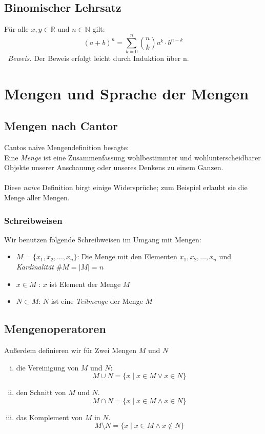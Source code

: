 \documentclass{scrreprt}
\newenvironment{proof}{\emph{\ Beweis.}}{}
\newcommand{\NN}{\mathbb{N}}
\newcommand{\RR}{\mathbb{R}}
\begin{document}
	\section{Binomischer Lehrsatz}
	Für alle $x, y \in \RR$ und $n \in \NN$ gilt:
	\begin{equation*}
		(a+b)^n = \sum\limits_{k=0}^n \binom{n}{k} a^k \cdot b^{n-k}
	\end{equation*}
	\begin{proof}
		Der Beweis erfolgt leicht durch Induktion über n.
	\end{proof}

	\chapter{Mengen und Sprache der Mengen}

	\section{Mengen nach Cantor}
	Cantos naive Mengendefinition besagte:\\
	Eine \emph{Menge} ist eine Zusammenfassung wohlbestimmter und wohlunterscheidbarer Objekte unserer Anschauung oder unseres Denkens zu einem Ganzen.\\ \\
	Diese \emph{naive} Definition birgt einige Widersprüche; zum Beispiel erlaubt sie die Menge aller Mengen.	

	\subsection{Schreibweisen}
	Wir benutzen folgende Schreibweisen im Umgang mit Mengen:
	\begin{itemize}
		\item
			$M = \lbrace x_1, x_2, \dots , x_n\rbrace$: Die Menge mit den Elementen $x_1, x_2, \dots, x_n$ und \emph{Kardinalität} $\# M = |M| = n$
		\item
			$x \in M$ : $x$ ist Element der Menge $M$
		\item
			$N \subset M$: $N$ ist eine \emph{Teilmenge} der Menge $M$
	\end{itemize}

	\section{Mengenoperatoren}
	Außerdem definieren wir für Zwei Mengen $M$ und $N$
	\begin{enumerate}[i)]
		\item
			die Vereinigung von $M$ und $N$:\\
			\[
				M \cup N = \lbrace x \mid x \in M \lor x \in N \rbrace
			\]
		\item
			den Schnitt von $M$ und $N$.
			\[
				M \cap N = \lbrace x \mid x \in M \land x \in N \rbrace
			\]
		\item
			das Komplement von $M$ in $N$.
			\[
				M \setminus N = \lbrace x \mid x \in M \land x \notin N \rbrace
			\]
	\end{enumerate}
\end{document}
